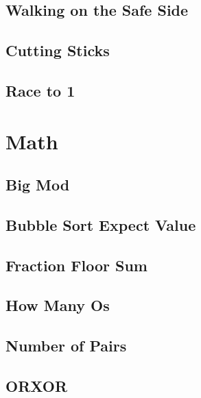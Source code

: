         \subsection{Walking on the Safe Side}
                
        \subsection{Cutting Sticks}
                
        \subsection{Race to 1}
                

\section{Math}
        \subsection{Big Mod}
                
        \subsection{Bubble Sort Expect Value}
                
        \subsection{Fraction Floor Sum}
                
        \subsection{How Many Os}
                
        \subsection{Number of Pairs}
                
        \subsection{ORXOR}
                
